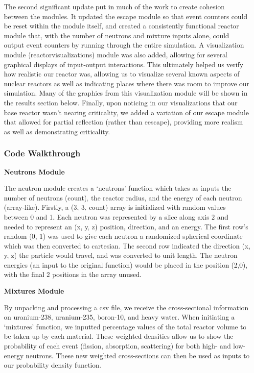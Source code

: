 \documentclass{notes}
\begin{document}
The second significant update put in much of the work to create cohesion between the modules. It updated the escape module so that event counters could be reset within the module itself, and created a consistently functional reactor module that, with the number of neutrons and mixture inputs alone, could output event counters by running through the entire simulation. A visualization module (reactor\textunderscore visualizations) module was also added, allowing for several graphical displays of input-output interactions. This ultimately helped us verify how realistic our reactor was, allowing us to visualize several known aspects of nuclear reactors as well as indicating places where there was room to improve our simulation. Many of the graphics from this visualization module will be shown in the results section below. Finally, upon noticing in our visualizations that our base reactor wasn't nearing criticality, we added a variation of our escape module that allowed for partial reflection (rather than eescape), providing more realism as well as demonstrating criticality.

\subsubsection*{Code Walkthrough}

\textbf{Neutrons Module}

The neutron module creates a `neutrons' function which takes as inputs the number of neutrons (count), the reactor radius, and the energy of each neutron (array-like). Firstly, a (3, 3, count) array is initialized with random values between 0 and 1. Each neutron was represented by a slice along axis 2 and needed to represent an (x, y, z) position, direction, and an energy. The first row's random (0, 1) was used to give each neutron a randomized spherical coordinate which was then converted to cartesian. The second row indicated the direction (x, y, z) the particle would travel, and was converted to unit length. The neutron energies (an input to the original function) would be placed in the position (2,0), with the final 2 positions in the array unused.

\textbf{Mixtures Module}

By unpacking and processing a csv file, we receive the cross-sectional information on uranium-238, uranium-235, boron-10, and heavy water. When initiating a `mixtures' function, we inputted percentage values of the total reactor volume to be taken up by each material. These weighted densities allow us to show the probability of each event (fission, absorption, scattering) for both high- and low-energy neutrons. These new weighted cross-sections can then be used as inputs to our probability density function.
\end{document}

